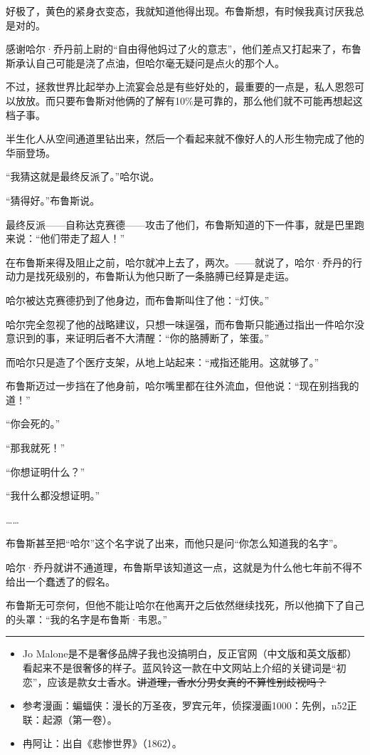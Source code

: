 \documentclass[../main]{subfiles}
\begin{document}
好极了，黄色的紧身衣变态，我就知道他得出现。布鲁斯想，有时候我真讨厌我总是对的。

感谢哈尔·乔丹前上尉的“自由得他妈过了火的意志”，他们差点又打起来了，布鲁斯承认自己可能是浇了点油，但哈尔毫无疑问是点火的那个人。

不过，拯救世界比起举办上流宴会总是有些好处的，最重要的一点是，私人恩怨可以放放。而只要布鲁斯对他俩的了解有10\%是可靠的，那么他们就不可能再想起这档子事。

半生化人从空间通道里钻出来，然后一个看起来就不像好人的人形生物完成了他的华丽登场。

“我猜这就是最终反派了。”哈尔说。

“猜得好。”布鲁斯说。

最终反派——自称达克赛德——攻击了他们，布鲁斯知道的下一件事，就是巴里跑来说：“他们带走了超人！”

在布鲁斯来得及阻止之前，哈尔就冲上去了，两次。——就说了，哈尔·乔丹的行动力是找死级别的，布鲁斯认为他只断了一条胳膊已经算是走运。

哈尔被达克赛德扔到了他身边，而布鲁斯叫住了他：“灯侠。”

哈尔完全忽视了他的战略建议，只想一味逞强，而布鲁斯只能通过指出一件哈尔没意识到的事，来证明后者不大清醒：“你的胳膊断了，笨蛋。”

而哈尔只是造了个医疗支架，从地上站起来：“戒指还能用。这就够了。”

布鲁斯迈过一步挡在了他身前，哈尔嘴里都在往外流血，但他说：“现在别挡我的道！”

“你会死的。”

“那我就死！”

“你想证明什么？”

“我什么都没想证明。”

……

布鲁斯甚至把“哈尔”这个名字说了出来，而他只是问“你怎么知道我的名字”。

哈尔·乔丹就讲不通道理，布鲁斯早该知道这一点，这就是为什么他七年前不得不给出一个蠢透了的假名。

布鲁斯无可奈何，但他不能让哈尔在他离开之后依然继续找死，所以他摘下了自己的头罩：“我的名字是布鲁斯·韦恩。”

\begin{center}\rule{0.5\linewidth}{0.5pt}\end{center}

\begin{itemize}
    \item
          Jo Malone是不是奢侈品牌子我也没搞明白，反正官网（中文版和英文版都）看起来不是很奢侈的样子。蓝风铃这一款在中文网站上介绍的关键词是“初恋”，应该是款女士香水。\st{讲道理，香水分男女真的不算性别歧视吗？}
    \item
          参考漫画：蝙蝠侠：漫长的万圣夜，罗宾元年，侦探漫画1000：先例，n52正联：起源（第一卷）。
    \item
          冉阿让：出自《悲惨世界》（1862）。
\end{itemize}
\end{document}
